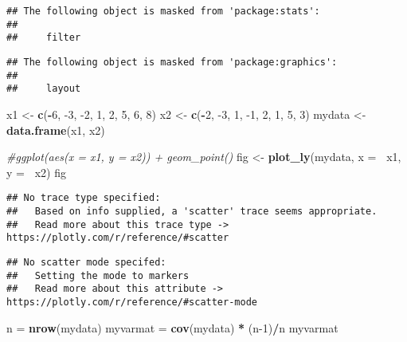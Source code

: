 \documentclass[
]{article}
\newenvironment{Shaded}{\begin{snugshade}}{\end{snugshade}}
\newcommand{\CommentTok}[1]{\textcolor[rgb]{0.56,0.35,0.01}{\textit{#1}}}
\newcommand{\DataTypeTok}[1]{\textcolor[rgb]{0.13,0.29,0.53}{#1}}
\newcommand{\DecValTok}[1]{\textcolor[rgb]{0.00,0.00,0.81}{#1}}
\newcommand{\KeywordTok}[1]{\textcolor[rgb]{0.13,0.29,0.53}{\textbf{#1}}}
\newcommand{\NormalTok}[1]{#1}
\newcommand{\OperatorTok}[1]{\textcolor[rgb]{0.81,0.36,0.00}{\textbf{#1}}}
\newcommand{\StringTok}[1]{\textcolor[rgb]{0.31,0.60,0.02}{#1}}
\begin{document}
\begin{verbatim}
## The following object is masked from 'package:stats':
## 
##     filter
\end{verbatim}

\begin{verbatim}
## The following object is masked from 'package:graphics':
## 
##     layout
\end{verbatim}

\begin{Shaded}
\begin{Highlighting}[]
\NormalTok{x1 <-}\StringTok{ }\KeywordTok{c}\NormalTok{(}\OperatorTok{-}\DecValTok{6}\NormalTok{, }\DecValTok{-3}\NormalTok{, }\DecValTok{-2}\NormalTok{, }\DecValTok{1}\NormalTok{, }\DecValTok{2}\NormalTok{, }\DecValTok{5}\NormalTok{, }\DecValTok{6}\NormalTok{, }\DecValTok{8}\NormalTok{)}
\NormalTok{x2 <-}\StringTok{ }\KeywordTok{c}\NormalTok{(}\OperatorTok{-}\DecValTok{2}\NormalTok{, }\DecValTok{-3}\NormalTok{, }\DecValTok{1}\NormalTok{, }\DecValTok{-1}\NormalTok{, }\DecValTok{2}\NormalTok{, }\DecValTok{1}\NormalTok{, }\DecValTok{5}\NormalTok{, }\DecValTok{3}\NormalTok{)}
\NormalTok{mydata <-}\StringTok{ }\KeywordTok{data.frame}\NormalTok{(x1, x2)}

\CommentTok{#ggplot(aes(x = x1, y = x2)) + geom_point()}
\NormalTok{fig <-}\StringTok{ }\KeywordTok{plot_ly}\NormalTok{(mydata, }\DataTypeTok{x =} \OperatorTok{~}\NormalTok{x1, }\DataTypeTok{y =} \OperatorTok{~}\NormalTok{x2)}
\NormalTok{fig}
\end{Highlighting}
\end{Shaded}

\begin{verbatim}
## No trace type specified:
##   Based on info supplied, a 'scatter' trace seems appropriate.
##   Read more about this trace type -> https://plotly.com/r/reference/#scatter
\end{verbatim}

\begin{verbatim}
## No scatter mode specifed:
##   Setting the mode to markers
##   Read more about this attribute -> https://plotly.com/r/reference/#scatter-mode
\end{verbatim}

\begin{Shaded}
\begin{Highlighting}[]
\NormalTok{n =}\StringTok{ }\KeywordTok{nrow}\NormalTok{(mydata)}
\NormalTok{myvarmat =}\StringTok{ }\KeywordTok{cov}\NormalTok{(mydata) }\OperatorTok{*}\StringTok{ }\NormalTok{(n}\DecValTok{-1}\NormalTok{)}\OperatorTok{/}\NormalTok{n}
\NormalTok{myvarmat}
\end{Highlighting}
\end{Shaded}
\end{document}
